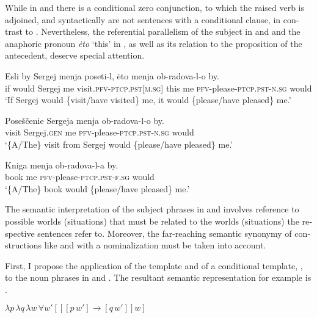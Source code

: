 \documentclass[output=paper,colorlinks,citecolor=brown]{langscibook}
\begin{document}
\begin{otherlanguage}{english}
While in  and  there is a conditional zero conjunction, to which the raised verb is adjoined,  and  syntactically are not sentences  with a conditional clause, in contrast to . Nevertheless, the referential parallelism of the subject in  and  and the anaphoric pronoun \textit{{\.e}to} ‘this' in , as well as its relation to the proposition of the antecedent, deserve special attention.

\ea\label{ex:16:30}
\gll Esli by Sergej menja poseti-l, {\.e}to menja ob-radova-l-o by. \\
if would Sergej me visit.\textsc{pfv}-\textsc{ptcp.pst}[\textsc{m.sg}] this me \textsc{pfv}-please-\textsc{ptcp.pst}-\textsc{n.sg} would   \\
\glt `If Sergej would \{visit/have visited\} me, it would \{please/have pleased\} me.'
\z

\ea\label{ex:16:31}
\gll Poseščenie Sergeja menja ob-radova-l-o by.  \\
 visit Sergej.\textsc{gen} %
 me \textsc{pfv}-please-\textsc{ptcp.pst}-\textsc{n.sg} would  \\
\glt `\{A/The\} visit from Sergej would \{please/have pleased\} me.'
\z

\ea\label{ex:16:32}
\gll Kniga menja ob-radova-l-a by. \\
   book me \textsc{pfv}-please-\textsc{ptcp.pst}-\textsc{f.sg} would \\
\glt `\{A/The\} book would \{please/have pleased\} me.'
\z

\noindent The semantic interpretation of the subject phrases in  and  involves reference to possible worlds (situations) that must be related to the worlds (situations) the respective sentences refer to. Moreover, the far-reaching semantic synonymy of constructions like  and  with a nominalization must be taken into account.

First, I propose the application of the template  and of a conditional template, , to the noun phrases in  and . The resultant semantic representation for example  is .

\begin{exe}
\ex  \label{ex:16:33}
$\lambda p \, \lambda q \, \lambda w \, \forall w' [[[p \, w' ] \to [q \, w']]w] $
\end{exe}



\end{otherlanguage}
\end{document}
